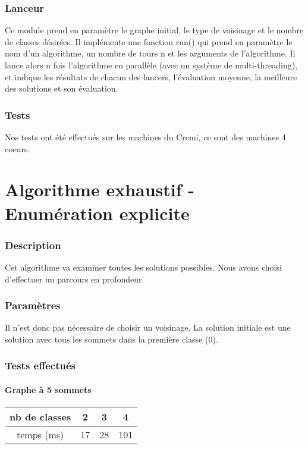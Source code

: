 \documentclass[12pt]{article}
\begin{document}
\section{Lanceur}

Ce module prend en paramètre le graphe initial, le type de voisinage et le nombre de classes désirées. Il implémente une fonction run() qui prend en paramètre le nom d’un algorithme, un nombre de tours n et les arguments de l’algorithme.
Il lance alors n fois l’algorithme en parallèle (avec un système de multi-threading), et indique les résultats de chacun des lancers, l’évaluation moyenne, la meilleure des solutions et son évaluation.

\section{Tests}

Nos tests ont été effectués sur les machines du Cremi, ce sont des machines 4 coeurs.

\newpage

\part{Algorithme exhaustif - Enumération explicite}

\section{Description}
Cet algorithme va examiner toutes les solutions possibles. Nous avons choisi d'effectuer un parcours en profondeur.

\section{Paramètres}
Il n’est donc pas nécessaire de choisir un voisinage. La solution initiale est une solution avec tous les sommets dans la première classe (0).

\section{Tests effectués}

\subsection{Graphe à 5 sommets}

\begin{tabular}{|c|c|c|c|}
	\hline 
	nb de classes & 2 & 3 & 4 \\
	\hline
	temps (ms) & 17 & 28 & 101 \\
	\hline
\end{tabular}
\end{document}
